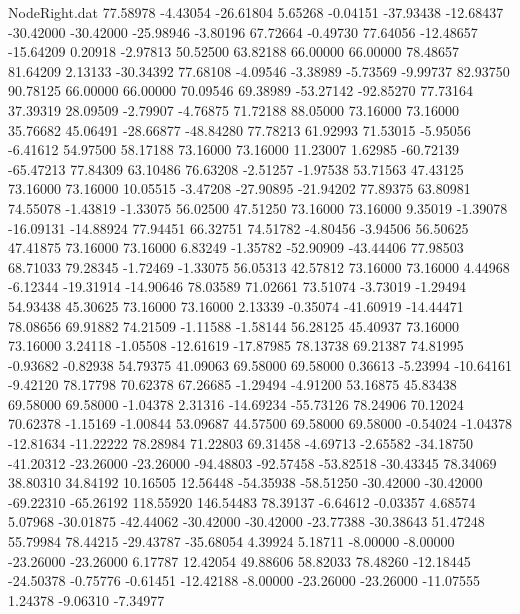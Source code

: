 \begin{filecontents}{NodeRight.dat}
  77.58978   -4.43054  -26.61804     5.65268   -0.04151  -37.93438  -12.68437  -30.42000  -30.42000  -25.98946   -3.80196   67.72664   -0.49730
  77.64056  -12.48657  -15.64209     0.20918   -2.97813   50.52500   63.82188   66.00000   66.00000   78.48657   81.64209    2.13133  -30.34392
  77.68108   -4.09546   -3.38989    -5.73569   -9.99737   82.93750   90.78125   66.00000   66.00000   70.09546   69.38989  -53.27142  -92.85270
  77.73164   37.39319   28.09509    -2.79907   -4.76875   71.72188   88.05000   73.16000   73.16000   35.76682   45.06491  -28.66877  -48.84280
  77.78213   61.92993   71.53015    -5.95056   -6.41612   54.97500   58.17188   73.16000   73.16000   11.23007    1.62985  -60.72139  -65.47213
  77.84309   63.10486   76.63208    -2.51257   -1.97538   53.71563   47.43125   73.16000   73.16000   10.05515   -3.47208  -27.90895  -21.94202
  77.89375   63.80981   74.55078    -1.43819   -1.33075   56.02500   47.51250   73.16000   73.16000    9.35019   -1.39078  -16.09131  -14.88924
  77.94451   66.32751   74.51782    -4.80456   -3.94506   56.50625   47.41875   73.16000   73.16000    6.83249   -1.35782  -52.90909  -43.44406
  77.98503   68.71033   79.28345    -1.72469   -1.33075   56.05313   42.57812   73.16000   73.16000    4.44968   -6.12344  -19.31914  -14.90646
  78.03589   71.02661   73.51074    -3.73019   -1.29494   54.93438   45.30625   73.16000   73.16000    2.13339   -0.35074  -41.60919  -14.44471
  78.08656   69.91882   74.21509    -1.11588   -1.58144   56.28125   45.40937   73.16000   73.16000    3.24118   -1.05508  -12.61619  -17.87985
  78.13738   69.21387   74.81995    -0.93682   -0.82938   54.79375   41.09063   69.58000   69.58000    0.36613   -5.23994  -10.64161   -9.42120
  78.17798   70.62378   67.26685    -1.29494   -4.91200   53.16875   45.83438   69.58000   69.58000   -1.04378    2.31316  -14.69234  -55.73126
  78.24906   70.12024   70.62378    -1.15169   -1.00844   53.09687   44.57500   69.58000   69.58000   -0.54024   -1.04378  -12.81634  -11.22222
  78.28984   71.22803   69.31458    -4.69713   -2.65582  -34.18750  -41.20312  -23.26000  -23.26000  -94.48803  -92.57458  -53.82518  -30.43345
  78.34069   38.80310   34.84192    10.16505   12.56448  -54.35938  -58.51250  -30.42000  -30.42000  -69.22310  -65.26192  118.55920  146.54483
  78.39137   -6.64612   -0.03357     4.68574    5.07968  -30.01875  -42.44062  -30.42000  -30.42000  -23.77388  -30.38643   51.47248   55.79984
  78.44215  -29.43787  -35.68054     4.39924    5.18711   -8.00000   -8.00000  -23.26000  -23.26000    6.17787   12.42054   49.88606   58.82033
  78.48260  -12.18445  -24.50378    -0.75776   -0.61451  -12.42188   -8.00000  -23.26000  -23.26000  -11.07555    1.24378   -9.06310   -7.34977

\end{filecontents}
